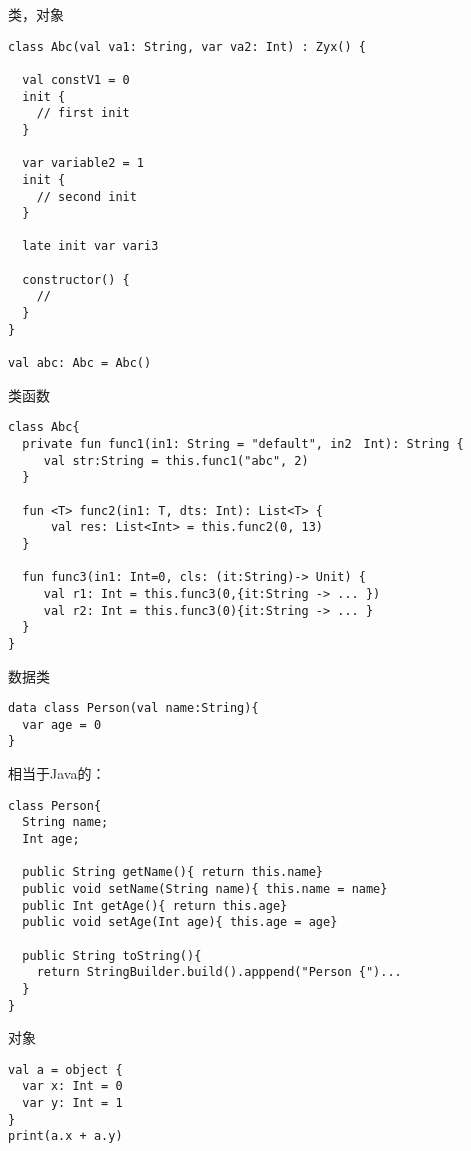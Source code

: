 \documentclass[UTF8]{ctexbeamer}
\begin{document}
\begin{frame}[fragile]{类，对象}
\begin{lstlisting}
class Abc(val va1: String, var va2: Int) : Zyx() {

  val constV1 = 0
  init {
    // first init
  }
  
  var variable2 = 1
  init {
    // second init
  }

  late init var vari3
  
  constructor() {
    // 
  }
}

val abc: Abc = Abc()
\end{lstlisting}
\end{frame}

\begin{frame}[fragile]{类函数}
\begin{lstlisting}
class Abc{
  private fun func1(in1: String = "default", in2　Int): String {
     val str:String = this.func1("abc", 2)   
  }
  
  fun <T> func2(in1: T, dts: Int): List<T> {
      val res: List<Int> = this.func2(0, 13)
  }

  fun func3(in1: Int=0, cls: (it:String)-> Unit) {
     val r1: Int = this.func3(0,{it:String -> ... })
     val r2: Int = this.func3(0){it:String -> ... }
  }
}
\end{lstlisting}
\end{frame}


\begin{frame}[fragile]{数据类}
\begin{lstlisting}
data class Person(val name:String){
  var age = 0
}
\end{lstlisting}
  相当于Java的：
\begin{lstlisting}
class Person{
  String name;
  Int age;

  public String getName(){ return this.name}
  public void setName(String name){ this.name = name}
  public Int getAge(){ return this.age}
  public void setAge(Int age){ this.age = age}

  public String toString(){
    return StringBuilder.build().apppend("Person {")...
  }
}
\end{lstlisting}
\end{frame}

\begin{frame}[fragile]{对象}
\begin{lstlisting}
val a = object {
  var x: Int = 0
  var y: Int = 1
}
print(a.x + a.y)
\end{lstlisting}
\end{frame}
\end{document}
